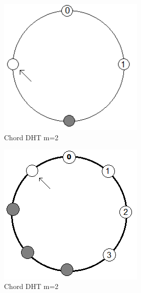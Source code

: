 \documentclass{article}
\begin{document}
\begin{enumerate}
\begin{figure}[ht!]
\centering
\includegraphics[width=70mm]{q2a_m2.png}
\caption{Chord DHT m=2}
\label{overflow}
\end{figure}


\begin{figure}[ht!]
\centering
\includegraphics[width=70mm]{q2a_m3.png}
\caption{Chord DHT m=2}
\label{overflow}
\end{figure}

\end{enumerate}
\end{document}
